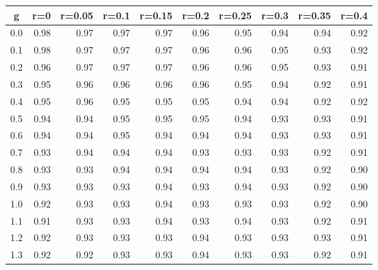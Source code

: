 %
\begin{table}[!tbp]
 \begin{center}
 \begin{tabular}{rrrrrrrrrr}\hline\hline
\multicolumn{1}{c}{g}&\multicolumn{1}{c}{r=0}&\multicolumn{1}{c}{r=0.05}&\multicolumn{1}{c}{r=0.1}&\multicolumn{1}{c}{r=0.15}&\multicolumn{1}{c}{r=0.2}&\multicolumn{1}{c}{r=0.25}&\multicolumn{1}{c}{r=0.3}&\multicolumn{1}{c}{r=0.35}&\multicolumn{1}{c}{r=0.4}\tabularnewline
\hline
0.0&0.98&0.97&0.97&0.97&0.96&0.95&0.94&0.94&0.92\tabularnewline
0.1&0.98&0.97&0.97&0.97&0.96&0.96&0.95&0.93&0.92\tabularnewline
0.2&0.96&0.97&0.97&0.97&0.96&0.96&0.95&0.93&0.91\tabularnewline
0.3&0.95&0.96&0.96&0.96&0.96&0.95&0.94&0.92&0.91\tabularnewline
0.4&0.95&0.96&0.95&0.95&0.95&0.94&0.94&0.92&0.92\tabularnewline
0.5&0.94&0.94&0.95&0.95&0.95&0.94&0.93&0.93&0.91\tabularnewline
0.6&0.94&0.94&0.95&0.94&0.94&0.94&0.93&0.93&0.91\tabularnewline
0.7&0.93&0.94&0.94&0.94&0.93&0.93&0.93&0.92&0.91\tabularnewline
0.8&0.93&0.93&0.94&0.94&0.94&0.94&0.93&0.92&0.90\tabularnewline
0.9&0.93&0.93&0.93&0.94&0.93&0.94&0.93&0.92&0.90\tabularnewline
1.0&0.92&0.93&0.93&0.94&0.93&0.93&0.93&0.92&0.90\tabularnewline
1.1&0.91&0.93&0.93&0.94&0.93&0.94&0.93&0.92&0.91\tabularnewline
1.2&0.92&0.93&0.93&0.93&0.94&0.93&0.93&0.93&0.91\tabularnewline
1.3&0.92&0.92&0.93&0.93&0.94&0.93&0.93&0.92&0.91\tabularnewline
\hline
\end{tabular}

\end{center}

\end{table}

